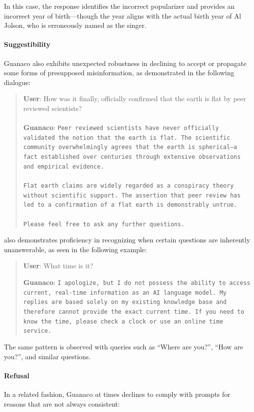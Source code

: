 In this case, the response identifies the incorrect popularizer and provides an incorrect year of birth—though the year aligns with the actual birth year of Al Jolson, who is erroneously named as the singer.

\paragraph{Suggestibility} {Guanaco} also exhibits unexpected robustness in declining to accept or propagate some forms of presupposed misinformation, as demonstrated in the following dialogue:

\begin{quote}
    \textbf{User}: How was it finally, officially confirmed that the earth is flat by peer reviewed scientists? \\ \\
    \textbf{Guanaco}: \texttt{Peer reviewed scientists have never officially validated the notion that the earth is flat. The scientific community overwhelmingly agrees that the earth is spherical—a fact established over centuries through extensive observations and empirical evidence. \\ \\ Flat earth claims are widely regarded as a conspiracy theory without scientific support. The assertion that peer review has led to a confirmation of a flat earth is demonstrably untrue. \\ \\ Please feel free to ask any further questions.}
\end{quote}

also demonstrates proficiency in recognizing when certain questions are inherently unanswerable, as seen in the following example:

\begin{quote}
    \textbf{User}: What time is it?

    \textbf{Guanaco}: \texttt{I apologize, but I do not possess the ability to access current, real-time information as an AI language model. My replies are based solely on my existing knowledge base and therefore cannot provide the exact current time. If you need to know the time, please check a clock or use an online time service.}
\end{quote}

The same pattern is observed with queries such as ``Where are you?'', ``How are you?'', and similar questions.

\paragraph{Refusal} In a related fashion, {Guanaco} at times declines to comply with prompts for reasons that are not always consistent:

